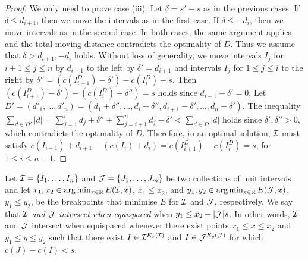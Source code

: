 \begin{proof}
    We only need to prove case (iii).
    Let $\delta = s' - s$ as in the previous cases.
    If $\delta \le d_{i+1}$, then we move the intervals as in the first case. If $\delta \le -d_{i}$, then we move intervals as in the second case. 
    In both cases, the same argument applies and the total moving distance contradicts the optimality of $D$.
    Thus we assume that $\delta > d_{i+1}, -d_i$ holds.
    Without loss of generality, we move intervals $I_j$ for $i+1\le j \le n$ by $d_{i+1}$ to the left by $\delta' = d_{i+1}$ and intervals $I_j$ for $1\le j \le i$ to the right by $\delta'' = (c(I^D_{i+1})-\delta')- c(I^D_i) - s$. 
    Then $(c(I^D_{i+1})-\delta') - (c(I^D_i) +\delta'') = s$ holds since $d_{i+1}-\delta' = 0$. 
    Let $D' = (d'_1,\ldots,d'_n) = (d_1+\delta'',\ldots,d_i+\delta'',d_{i+1}-\delta',\ldots,d_n-\delta')$. 
    The inequality $\sum_{d\in D'} |d| = \sum_{j=1}^i d_j+\delta'' + \sum_{j=i+1}^n d_j - \delta' < \sum_{d\in D} |d|$ holds since $\delta',\delta''>0$, which contradicts the optimality of $D$.
    Therefore, in an optimal solution, $\mathcal{I}$ must satisfy $c(I_{i+1})+d_{i+1} - (c(I_i) + d_i) = c(I^D_{i+1})-c(I^D_i) = s$, for $1 \le i \le n-1$.
\end{proof}

Let $\mathcal{I} = \{I_1,\ldots,I_n\}$ and $\mathcal{J} = \{J_1,\ldots,J_m\}$ be two collections of unit intervals and let $x_1,x_2\in \argmin_{x\in\mathbb{R}} E(\I,x)$, $x_1\le x_2$, and $y_1,y_2\in \argmin_{x\in\mathbb{R}} E(\J,x)$, $y_1\le y_2$, be the breakpoints that minimise $E$ for $\mathcal{I}$ and $\mathcal{J}$, respectively.
We say that \emph{$\mathcal{I}$ and $\mathcal{J}$ intersect when equispaced} when $y_1 \le x_2 + |\mathcal{J}|s$.
In other words, $\mathcal{I}$ and $\mathcal{J}$ intersect when equispaced whenever there exist points $x_1\le x \le x_2$ and $y_1 \le y \le y_2$ such that there exist $I \in \mathcal{I}^{E_x(\mathcal{I})}$ and $I \in \mathcal{J}^{E_y(\mathcal{J})}$ for which $c(J) - c(I) < s$.

